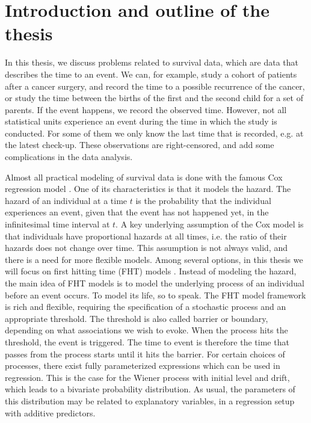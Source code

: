 \chapter{Introduction and outline of the thesis}
\label{sec:intro}
In this thesis, we discuss problems related to survival data, which are data that describes the time to an event.
We can, for example, study a cohort of patients after a cancer surgery, and record the time to a possible recurrence of the cancer, or study the time between the births of the first and the second child for a set of parents.
If the event happens, we record the observed time.
However, not all statistical units experience an event during the time in which the study is conducted.
For some of them we only know the last time that is recorded, e.g. at the latest check-up.
These observations are right-censored, and add some complications in the data analysis.

Almost all practical modeling of survival data is done with the famous Cox regression model \citep{cox-model}.
One of its characteristics is that it models the hazard.
The hazard of an individual at a time $t$ is the probability that the individual experiences an event, given that the event has not happened yet, in the infinitesimal time interval at $t$.
A key underlying assumption of the Cox model is that individuals have proportional hazards at all times, i.e. the ratio of their hazards does not change over time.
This assumption is not always valid, and there is a need for more flexible models.
Among several options, in this thesis we will focus on first hitting time (FHT) models \citep{leewhitmore2006}.
Instead of modeling the hazard, the main idea of FHT models is to model the underlying process of an individual before an event occurs.
To model its life, so to speak.
The FHT model framework is rich and flexible, requiring the specification of a stochastic process and an appropriate threshold.
The threshold is also called barrier or boundary, depending on what associations we wish to evoke.
When the process hits the threshold, the event is triggered.
The time to event is therefore the time that passes from the process starts until it hits the barrier.
For certain choices of processes, there exist fully parameterized expressions which can be used in regression.
This is the case for the Wiener process with initial level and drift, which leads to a bivariate probability distribution.
As usual, the parameters of this distribution may be related to explanatory variables, in a regression setup with additive predictors.

